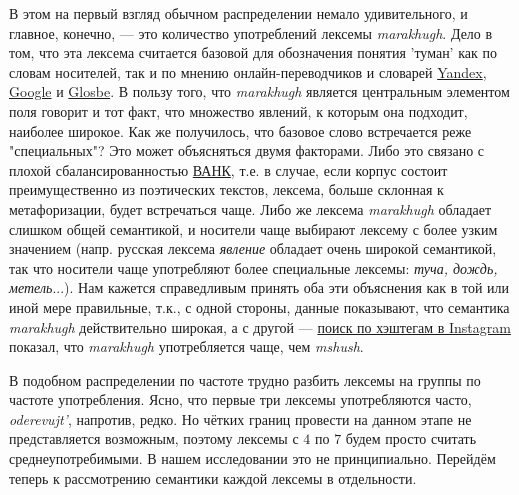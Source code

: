 В этом на первый взгляд обычном распределении немало удивительного, и главное, конечно, --- это количество употреблений лексемы \textit{marakhugh}. Дело в том, что эта лексема считается базовой для обозначения понятия 'туман' как по словам носителей, так и по мнению онлайн-переводчиков и словарей \hyperlink{yt}{Yandex}, \hyperlink{gt}{Google} и \hyperlink{glosbe}{Glosbe}. В пользу того, что \textit{marakhugh} является центральным элементом поля говорит и тот факт, что множество явлений, к которым она подходит, наиболее широкое. Как же получилось, что базовое слово встречается реже "специальных"? Это может объясняться двумя факторами. Либо это связано с плохой сбалансированностью \hyperlink{eanc}{ВАНК}, т.е. в случае, если корпус состоит преимущественно из поэтических текстов, лексема, больше склонная к метафоризации, будет встречаться чаще. Либо же лексема \textit{marakhugh} обладает слишком общей семантикой, и носители чаще выбирают лексему с более узким значением (напр. русская лексема \textit{явление} обладает очень широкой семантикой, так что носители чаще употребляют более специальные лексемы: \textit{туча, дождь, метель}...). Нам кажется справедливым принять оба эти объяснения как в той или иной мере правильные, т.к., с одной стороны, данные показывают, что семантика \textit{marakhugh} действительно широкая, а с другой --- \hyperlink{inst}{поиск по хэштегам в Instagram} показал, что \textit{marakhugh} употребляется чаще, чем \textit{mshush}.

\par В подобном распределении по частоте трудно разбить лексемы на группы по частоте употребления. Ясно, что первые три лексемы употребляются часто, \textit{oderevujt’}, напротив, редко. Но чётких границ провести на данном этапе не представляется возможным, поэтому лексемы с $4$ по $7$ будем просто считать среднеупотребимыми. В нашем исследовании это не принципиально. Перейдём теперь к рассмотрению семантики каждой лексемы в отдельности.


